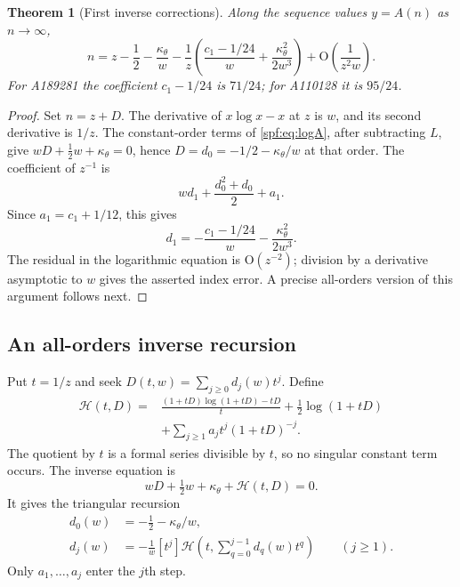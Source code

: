 \documentclass[11pt]{article}
\numberwithin{equation}{section}
\newtheorem{theorem}{Theorem}[section]
\theoremstyle{definition}
\theoremstyle{remark}
\theoremstyle{definition}
\newcommand{\bigO}{\mathrm O}
\begin{document}
\begin{theorem}[First inverse corrections]
\label{spf:thm:inverse-first}
Along the sequence values $y=A(n)$ as $n\to\infty$,
\begin{equation}
 \boxed{\displaystyle
 n=z-\frac12-\frac{\kappa_\theta}{w}
     -\frac1z\left(\frac{c_1-1/24}{w}
                    +\frac{\kappa_\theta^2}{2w^3}\right)
     +\bigO\left(\frac1{z^2w}\right).}
 \label{spf:eq:inverse-first}
\end{equation}
For A189281 the coefficient $c_1-1/24$ is $71/24$; for A110128 it is $95/24$.
\end{theorem}
\begin{proof}
Set $n=z+D$. The derivative of $x\log x-x$ at $z$ is $w$, and its second
derivative is $1/z$. The constant-order terms of \eqref{spf:eq:logA}, after
subtracting $L$, give
$wD+\tfrac12w+\kappa_\theta=0$, hence
$D=d_0=-1/2-\kappa_\theta/w$ at that order. The coefficient of $z^{-1}$ is
\begin{equation}
 w d_1+\frac{d_0^2+d_0}{2}+a_1.
\end{equation}
Since $a_1=c_1+1/12$, this gives
\begin{equation}
 d_1=-\frac{c_1-1/24}{w}-\frac{\kappa_\theta^2}{2w^3}.
\end{equation}
The residual in the logarithmic equation is $\bigO(z^{-2})$; division by a
derivative asymptotic to $w$ gives the asserted index error. A precise
all-orders version of this argument follows next.
\end{proof}

\subsection{An all-orders inverse recursion}

Put $t=1/z$ and seek $D(t,w)=\sum_{j\ge0}d_j(w)t^j$. Define
\begin{equation}
 \begin{split}
 \mathcal H(t,D)={}&
 \frac{(1+tD)\log(1+tD)-tD}{t}
 +\frac12\log(1+tD)\\
 &+\sum_{j\ge1}a_jt^j(1+tD)^{-j}.
 \end{split}
 \label{spf:eq:H-inverse}
\end{equation}
The quotient by $t$ is a formal series divisible by $t$, so no singular
constant term occurs. The inverse equation is
\begin{equation}
 wD+\tfrac12w+\kappa_\theta+\mathcal H(t,D)=0.
\end{equation}
It gives the triangular recursion
\begin{align}
 d_0(w)&=-\tfrac12-\kappa_\theta/w,\\
 d_j(w)&=-\frac1w[t^j]\mathcal H\left(t,\sum_{q=0}^{j-1}d_q(w)t^q\right)
             \qquad(j\ge1).
 \label{spf:eq:inverse-recursion}
\end{align}
Only $a_1,\ldots,a_j$ enter the $j$th step.
\end{document}
